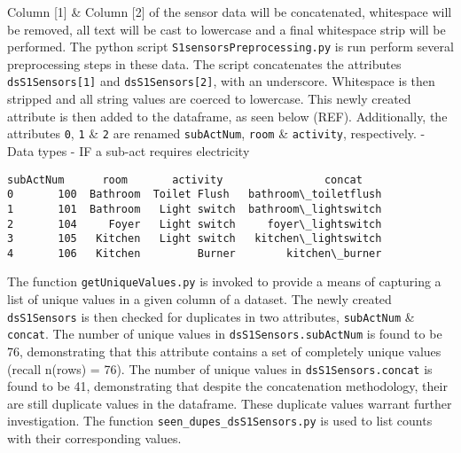 \documentclass[reprint, floatfix, groupaddress, prb]{revtex4-1}
\newcommand{\prompt}[4]{
        \llap{{\color{#2}[#3]: #4}}\vspace{-1.25em}
    }
\begin{document}
    Column {[}1{]} \& Column {[}2{]} of the sensor data will be
concatenated, whitespace will be removed, all text will be cast to
lowercase and a final whitespace strip will be performed. The python
script \texttt{S1sensorsPreprocessing.py} is run perform several
preprocessing steps in these data. The script concatenates the
attributes \texttt{dsS1Sensors{[}1{]}} and \texttt{dsS1Sensors{[}2{]}},
with an underscore. Whitespace is then stripped and all string values
are coerced to lowercase. This newly created attribute is then added to
the dataframe, as seen below (REF). Additionally, the attributes
\texttt{0}, \texttt{1} \& \texttt{2} are renamed \texttt{subActNum},
\texttt{room} \& \texttt{activity}, respectively. - Data types - IF a
sub-act requires electricity



            \begin{tcolorbox}[breakable, boxrule=.5pt, size=fbox, pad at break*=1mm, opacityfill=0]
\prompt{Out}{outcolor}{25}{\hspace{3.5pt}}
\begin{Verbatim}[commandchars=\\\{\}]
  subActNum      room       activity                concat
0       100  Bathroom  Toilet Flush   bathroom\_toiletflush
1       101  Bathroom   Light switch  bathroom\_lightswitch
2       104     Foyer   Light switch     foyer\_lightswitch
3       105   Kitchen   Light switch   kitchen\_lightswitch
4       106   Kitchen         Burner        kitchen\_burner
\end{Verbatim}
\end{tcolorbox}
        
    The function \texttt{getUniqueValues.py} is invoked to provide a means
of capturing a list of unique values in a given column of a dataset. The
newly created \texttt{dsS1Sensors} is then checked for duplicates in two
attributes, \texttt{subActNum} \& \texttt{concat}. The number of unique
values in \texttt{dsS1Sensors.subActNum} is found to be 76,
demonstrating that this attribute contains a set of completely unique
values (recall n(rows) = 76). The number of unique values in
\texttt{dsS1Sensors.concat} is found to be 41, demonstrating that
despite the concatenation methodology, their are still duplicate values
in the dataframe. These duplicate values warrant further investigation.
The function \texttt{seen\_dupes\_dsS1Sensors.py} is used to list counts
with their corresponding values.
\end{document}
